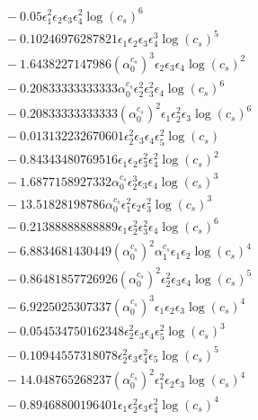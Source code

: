 \documentclass[10pt]{article}
\begin{document}
\begin{align*}
&{}  - 0.05 \epsilon_{1}^{2} \epsilon_{2} \epsilon_{3} \epsilon_{4}^{2} \log{\left(c_{s} \right)}^{6} \\
&{}  - 0.10246976287821 \epsilon_{1} \epsilon_{2} \epsilon_{3} \epsilon_{4}^{3} \log{\left(c_{s} \right)}^{5} \\
&{}  - 1.6438227147986 \left(\alpha_{0}^{c_s}\right)^{3} \epsilon_{2} \epsilon_{3} \epsilon_{4} \log{\left(c_{s} \right)}^{2} \\
&{}  - 0.20833333333333 \alpha_{0}^{c_s} \epsilon_{2}^{2} \epsilon_{3}^{2} \epsilon_{4} \log{\left(c_{s} \right)}^{6} \\
&{}  - 0.20833333333333 \left(\alpha_{0}^{c_s}\right)^{2} \epsilon_{1} \epsilon_{2}^{2} \epsilon_{3} \log{\left(c_{s} \right)}^{6} \\
&{}  - 0.013132232670601 \epsilon_{2}^{2} \epsilon_{3} \epsilon_{4} \epsilon_{5}^{2} \log{\left(c_{s} \right)} \\
&{}  - 0.84343480769516 \epsilon_{1} \epsilon_{2} \epsilon_{3}^{2} \epsilon_{4}^{2} \log{\left(c_{s} \right)}^{2} \\
&{}  - 1.6877158927332 \alpha_{0}^{c_s} \epsilon_{2}^{3} \epsilon_{3} \epsilon_{4} \log{\left(c_{s} \right)}^{3} \\
&{}  - 13.51828198786 \alpha_{0}^{c_s} \epsilon_{1}^{2} \epsilon_{2} \epsilon_{3}^{2} \log{\left(c_{s} \right)}^{3} \\
&{}  - 0.21388888888889 \epsilon_{1} \epsilon_{2}^{2} \epsilon_{3}^{2} \epsilon_{4} \log{\left(c_{s} \right)}^{6} \\
&{}  - 6.8834681430449 \left(\alpha_{0}^{c_s}\right)^{2} \alpha_{1}^{c_s} \epsilon_{1} \epsilon_{2} \log{\left(c_{s} \right)}^{4} \\
&{}  - 0.86481857726926 \left(\alpha_{0}^{c_s}\right)^{2} \epsilon_{2}^{2} \epsilon_{3} \epsilon_{4} \log{\left(c_{s} \right)}^{5} \\
&{}  - 6.9225025307337 \left(\alpha_{0}^{c_s}\right)^{3} \epsilon_{1} \epsilon_{2} \epsilon_{3} \log{\left(c_{s} \right)}^{4} \\
&{}  - 0.054534750162348 \epsilon_{2}^{2} \epsilon_{3} \epsilon_{4} \epsilon_{5}^{2} \log{\left(c_{s} \right)}^{3} \\
&{}  - 0.10944557318078 \epsilon_{2}^{2} \epsilon_{3} \epsilon_{4}^{2} \epsilon_{5} \log{\left(c_{s} \right)}^{5} \\
&{}  - 14.048765268237 \left(\alpha_{0}^{c_s}\right)^{2} \epsilon_{1}^{2} \epsilon_{2} \epsilon_{3} \log{\left(c_{s} \right)}^{4} \\
&{}  - 0.89468800196401 \epsilon_{1} \epsilon_{2}^{2} \epsilon_{3} \epsilon_{4}^{2} \log{\left(c_{s} \right)}^{4} \\

\end{align*}
\end{document}
